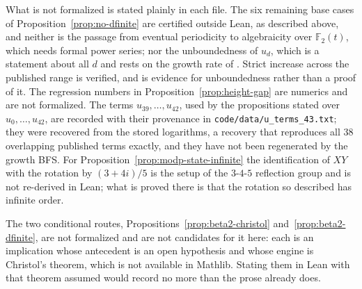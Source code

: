 \documentclass[11pt,a4paper]{article}
\theoremstyle{remark}
\theoremstyle{plain}
\begin{document}
What is not formalized is stated plainly in each file. The six remaining base cases of
Proposition~\ref{prop:no-dfinite} are certified outside Lean, as described above, and neither
is the passage
from eventual periodicity to algebraicity over $\mathbb{F}_2(t)$, which needs formal power
series; nor the unboundedness of $u_d$, which is a statement about all $d$ and rests on the
growth rate of \cite{Bonfioli2}. Strict increase across the published range is verified, and
is evidence for unboundedness rather than a proof of it. The regression numbers in
Proposition~\ref{prop:height-gap} are numerics and are not formalized. The terms
$u_{39}, \ldots, u_{42}$, used by the propositions stated over $u_0, \ldots, u_{42}$, are
recorded with their provenance in \texttt{code/data/u\_terms\_43.txt}; they were recovered
from the stored logarithms, a recovery that reproduces all $38$ overlapping published terms
exactly, and they have not been regenerated by the growth BFS. For
Proposition~\ref{prop:modp-state-infinite} the identification of $XY$ with the rotation by
$(3+4i)/5$ is the setup of the $3$-$4$-$5$ reflection group and is not re-derived in Lean;
what is proved there is that the rotation so described has infinite order.

The two conditional routes, Propositions~\ref{prop:beta2-christol}
and~\ref{prop:beta2-dfinite}, are not formalized and are not candidates for it here: each is
an implication whose antecedent is an open hypothesis and whose engine is Christol's theorem,
which is not available in Mathlib. Stating them in Lean with that theorem assumed would record
no more than the prose already does.
\end{document}
